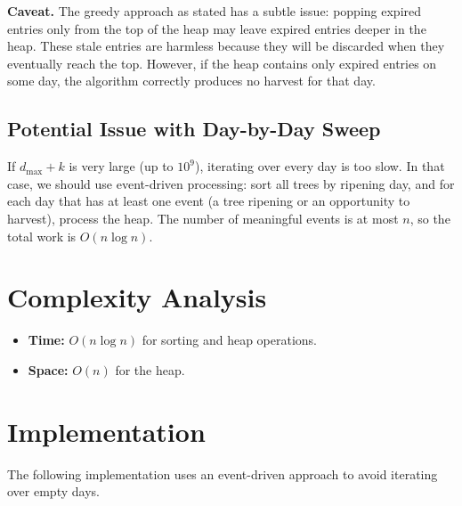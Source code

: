 \documentclass[11pt,a4paper]{article}
\begin{document}
\textbf{Caveat.} The greedy approach as stated has a subtle issue: popping
expired entries only from the top of the heap may leave expired entries
deeper in the heap. These stale entries are harmless because they will be
discarded when they eventually reach the top. However, if the heap contains
only expired entries on some day, the algorithm correctly produces no harvest
for that day.

\subsection{Potential Issue with Day-by-Day Sweep}

If $d_{\max} + k$ is very large (up to $10^9$), iterating over every day is
too slow. In that case, we should use event-driven processing: sort all trees
by ripening day, and for each day that has at least one event (a tree
ripening or an opportunity to harvest), process the heap. The number of
meaningful events is at most $n$, so the total work is $O(n \log n)$.

\section{Complexity Analysis}

\begin{itemize}
  \item \textbf{Time:} $O(n \log n)$ for sorting and heap operations.
  \item \textbf{Space:} $O(n)$ for the heap.
\end{itemize}

\section{Implementation}

The following implementation uses an event-driven approach to avoid iterating
over empty days.
\end{document}
